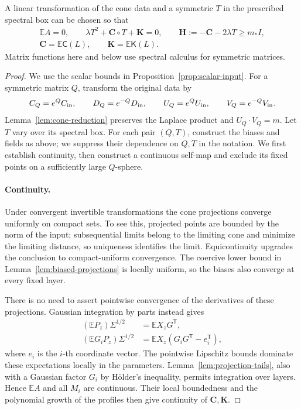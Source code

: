 \begin{proposition}\label{prop:normalization}
A linear transformation of the cone data and a symmetric \(T\) in the prescribed spectral box can be chosen so that
\[
\begin{gathered}
\mathbb EA=0,\qquad \lambda T^2+\mathbf C\circ T+\mathbf K=0,\qquad
\mathbf H:=-\mathbf C-2\lambda T\ge m_*I,\\
\mathbf C=\mathbb E\mathsf C(L),\qquad \mathbf K=\mathbb E\mathsf K(L).
\end{gathered}\tag{8}\label{eq:8}
\]
Matrix functions here and below use spectral calculus for symmetric matrices.
\end{proposition}
\begin{proof}
We use the scalar bounds in Proposition~\ref{prop:scalar-input}. For a
symmetric matrix \(Q\), transform the original data by
\[
 C_Q=e^QC_{\rm in},\qquad D_Q=e^{-Q}D_{\rm in},\qquad
 U_Q=e^QU_{\rm in},\qquad V_Q=e^{-Q}V_{\rm in}.
\]
Lemma~\ref{lem:cone-reduction} preserves the Laplace product and
\(U_Q\cdot V_Q=m\). Let \(T\) vary over its spectral box. For each
pair \((Q,T)\), construct the biases and fields as above; we suppress
their dependence on \(Q,T\) in the notation. We first establish
continuity, then construct a continuous self-map and exclude its fixed
points on a sufficiently large \(Q\)-sphere.

\paragraph{Continuity.}
Under convergent invertible transformations the cone projections converge uniformly on compact sets. To see this, projected points are bounded by the norm of the input; subsequential limits belong to the limiting cone and minimize the limiting distance, so uniqueness identifies the limit. Equicontinuity upgrades the conclusion to compact-uniform convergence. The coercive lower bound in Lemma~\ref{lem:biased-projections} is locally uniform, so the biases also converge at every fixed layer.

There is no need to assert pointwise convergence of the derivatives of these projections. Gaussian integration by parts instead gives
\[
\begin{aligned}
(\mathbb EP_z)\Sigma^{1/2}&=\mathbb E X_zG^{\mathsf T},\\
(\mathbb E G_iP_z)\Sigma^{1/2}
&=\mathbb E X_z(G_iG^{\mathsf T}-e_i^{\mathsf T}),
\end{aligned}
\]
where \(e_i\) is the \(i\)-th coordinate vector. The pointwise Lipschitz bounds dominate these expectations locally in the parameters. Lemma~\ref{lem:projection-tails}, also with a Gaussian factor \(G_i\) by H\"older's inequality, permits integration over layers. Hence \(\mathbb EA\) and all \(M_i\) are continuous. Their local boundedness and the polynomial growth of the profiles then give continuity of \(\mathbf C,\mathbf K\).


\end{proof}
